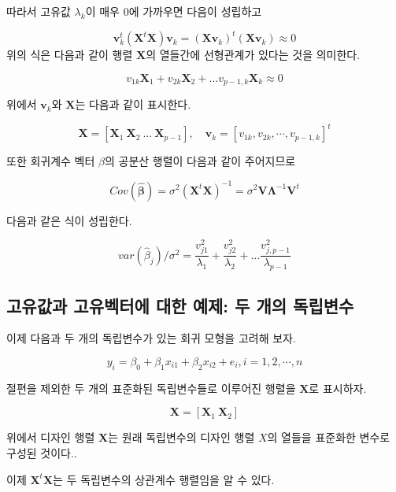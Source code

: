 \documentclass[
]{book}
\begin{document}
따라서 고유값 \(\lambda_k\)이 매우 0에 가까우면 다음이 성립하고

\[ \bm v_k^t (\bm X^t \bm X) \bm v_k = (\bm X \bm v_k)^t ( \bm X \bm v_k) \approx 0   \]
위의 식은 다음과 같이 행렬 \(\bm X\)의 열들간에 선형관계가 있다는 것을 의미한다.

\[  v_{1k} \bm X_1 +  v_{2k} \bm X_2 + \dots  v_{p-1,k} \bm X_k \approx 0 \]

위에서 \(\bm v_k\)와 \(\bm X\)는 다음과 같이 표시한다.

\[ \bm X=[\bm X_1~ \bm X_2~ \dots~\bm X_{p-1}], \quad 
\bm v_k = [ v_{1k},  v_{2k}, \cdots,  v_{p-1,k}]^t \]

또한 회귀계수 벡터 \(\hat \beta\)의 공분산 행렬이 다음과 같이 주어지므로

\begin{equation} 
Cov(\hat {\bm \beta}) = \sigma^2 (\bm X^t \bm X)^{-1} = \sigma^2  \bm V \bm \Lambda^{-1} \bm V^t 
\label{eq:eq1}
\end{equation}

다음과 같은 식이 성립한다.

\begin{equation} 
var(\hat \beta_j) / \sigma^2 = \frac{v^2_{j1}}{\lambda_1} + \frac{v^2_{j2}}{\lambda_2} + \dots \frac{v^2_{j, p-1}}{\lambda_{p-1}} 
\label{eq:eq2}
\end{equation}

\hypertarget{uxace0uxc720uxac12uxacfc-uxace0uxc720uxbca1uxd130uxc5d0-uxb300uxd55c-uxc608uxc81c-uxb450-uxac1cuxc758-uxb3c5uxb9bduxbcc0uxc218}{%
\subsection{고유값과 고유벡터에 대한 예제: 두 개의 독립변수}\label{uxace0uxc720uxac12uxacfc-uxace0uxc720uxbca1uxd130uxc5d0-uxb300uxd55c-uxc608uxc81c-uxb450-uxac1cuxc758-uxb3c5uxb9bduxbcc0uxc218}}

이제 다음과 두 개의 독립변수가 있는 회귀 모형을 고려해 보자.

\[ y_i = \beta_0 + \beta_1 x_{i1} + \beta_2 x_{i2} + e_i, i=1,2,\cdots,n \]

절편을 제외한 두 개의 표준화된 독립변수들로 이루어진 행렬을 \(\bm X\)로 표시하자.

\[  \bm X = [ \bm X_1 ~ \bm X_2 ]   \]

위에서 디자인 행렬 \(\bm X\)는 원래 독립변수의 디자인 행렬 \(X\)의 열들을 표준화한 변수로 구성된 것이다..

이제 \(\bm X^t \bm X\)는 두 독립변수의 상관계수 행렬임을 알 수 있다.
\end{document}
